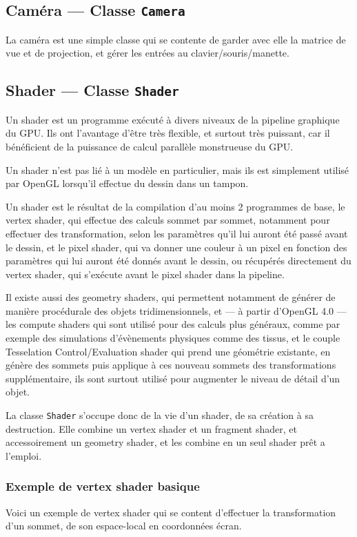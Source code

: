 \documentclass[pdftex, 11pt, a4paper, titlepage]{article}
\begin{document}
\pagebreak
\subsection{Caméra --- Classe \texttt{Camera}}

La caméra est une simple classe qui se contente de garder avec elle la
matrice de vue et de projection, et gérer les entrées au
clavier/souris/manette.

\subsection{Shader --- Classe \texttt{Shader}}

Un shader est un programme exécuté à divers niveaux de la pipeline
graphique du GPU.  Ils ont l'avantage d'être très flexible, et surtout
très puissant, car il bénéficient de la puissance de calcul parallèle
monstrueuse du GPU.

Un shader n'est pas lié à un modèle en particulier, mais ils est
simplement utilisé par OpenGL lorsqu'il effectue du dessin dans un
tampon.

Un shader est le résultat de la compilation d'au moins 2 programmes de
base, le vertex shader, qui effectue des calculs sommet par sommet,
notamment pour effectuer des transformation, selon les paramètres
qu'il lui auront été passé avant le dessin, et le pixel shader, qui va
donner une couleur à un pixel en fonction des paramètres qui lui
auront été donnés avant le dessin, ou récupérés directement du vertex
shader, qui s'exécute avant le pixel shader dans la pipeline.

Il existe aussi des geometry shaders, qui permettent notamment de
générer de manière procédurale des objets tridimensionnels, et --- à
partir d'OpenGL 4.0 --- les compute shaders qui sont utilisé pour des
calculs plus généraux, comme par exemple des simulations d'évènements
physiques comme des tissus, et le couple Tesselation
Control/Evaluation shader qui prend une géométrie existante, en génère
des sommets puis applique à ces nouveau sommets des transformations
supplémentaire, ils sont surtout utilisé pour augmenter le niveau de
détail d'un objet.

La classe \texttt{Shader} s'occupe donc de la vie d'un shader, de sa
création à sa destruction.  Elle combine un vertex shader et un
fragment shader, et accessoirement un geometry shader, et les combine
en un seul shader prêt a l'emploi.

\subsubsection{Exemple de vertex shader basique}
Voici un exemple de vertex shader qui se content d'effectuer la
transformation d'un sommet, de son espace-local en coordonnées écran.
\end{document}
